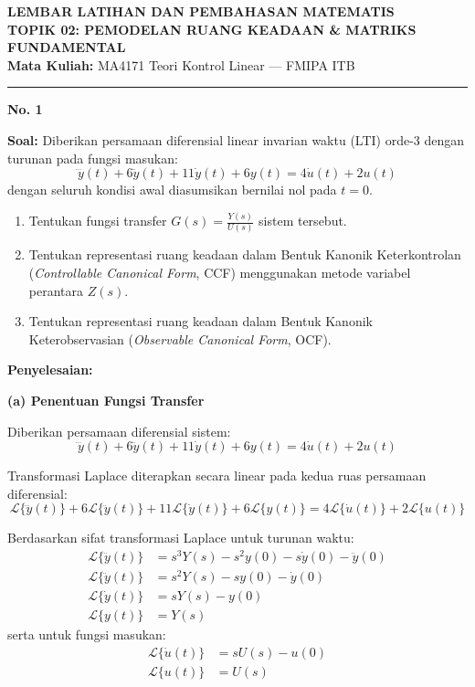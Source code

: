 \documentclass[11pt,a4paper]{article}
\begin{document}
\begin{center}
    {\Large \textbf{LEMBAR LATIHAN DAN PEMBAHASAN MATEMATIS}}\\[4pt]
    {\large \textbf{TOPIK 02: PEMODELAN RUANG KEADAAN \& MATRIKS FUNDAMENTAL}}\\[4pt]
    \textbf{Mata Kuliah:} MA4171 Teori Kontrol Linear --- FMIPA ITB
\end{center}
\hrule
\vspace{10pt}

\textbf{\large No. 1}

\textbf{Soal:}  
Diberikan persamaan diferensial linear invarian waktu (LTI) orde-3 dengan turunan pada fungsi masukan:
$$\dddot{y}(t) + 6\ddot{y}(t) + 11\dot{y}(t) + 6y(t) = 4\dot{u}(t) + 2u(t)$$
dengan seluruh kondisi awal diasumsikan bernilai nol pada $t = 0$.
\begin{enumerate}[label=(\alph*)]
    \item Tentukan fungsi transfer $G(s) = \frac{Y(s)}{U(s)}$ sistem tersebut.
    \item Tentukan representasi ruang keadaan dalam Bentuk Kanonik Keterkontrolan (\textit{Controllable Canonical Form}, CCF) menggunakan metode variabel perantara $Z(s)$.
    \item Tentukan representasi ruang keadaan dalam Bentuk Kanonik Keterobservasian (\textit{Observable Canonical Form}, OCF).
\end{enumerate}

\textbf{Penyelesaian:}

\textbf{(a) Penentuan Fungsi Transfer}

Diberikan persamaan diferensial sistem:
$$\dddot{y}(t) + 6\ddot{y}(t) + 11\dot{y}(t) + 6y(t) = 4\dot{u}(t) + 2u(t)$$

Transformasi Laplace diterapkan secara linear pada kedua ruas persamaan diferensial:
$$\mathcal{L}\{\dddot{y}(t)\} + 6\mathcal{L}\{\ddot{y}(t)\} + 11\mathcal{L}\{\dot{y}(t)\} + 6\mathcal{L}\{y(t)\} = 4\mathcal{L}\{\dot{u}(t)\} + 2\mathcal{L}\{u(t)\}$$

Berdasarkan sifat transformasi Laplace untuk turunan waktu:
\begin{align*}
    \mathcal{L}\{\dddot{y}(t)\} &= s^3 Y(s) - s^2 y(0) - s \dot{y}(0) - \ddot{y}(0) \\
    \mathcal{L}\{\ddot{y}(t)\} &= s^2 Y(s) - s y(0) - \dot{y}(0) \\
    \mathcal{L}\{\dot{y}(t)\} &= s Y(s) - y(0) \\
    \mathcal{L}\{y(t)\} &= Y(s)
\end{align*}
serta untuk fungsi masukan:
\begin{align*}
    \mathcal{L}\{\dot{u}(t)\} &= s U(s) - u(0) \\
    \mathcal{L}\{u(t)\} &= U(s)
\end{align*}
\end{document}

